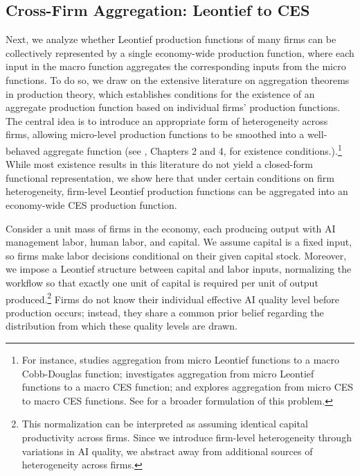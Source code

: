 \subsection{Cross-Firm Aggregation: Leontief to CES}

Next, we analyze whether Leontief production functions of many firms can be collectively represented by a single economy-wide production function, where each input in the macro function aggregates the corresponding inputs from the micro functions. 
To do so, we draw on the extensive literature on aggregation theorems in production theory, which establishes conditions for the existence of an aggregate production function based on individual firms' production functions.
The central idea is to introduce an appropriate form of heterogeneity across firms, allowing micro-level production functions to be smoothed into a well-behaved aggregate function (see \cite{sato1975production}, Chapters 2 and 4, for existence conditions.).\footnote{
For instance, \cite{houthakker1955pareto} studies aggregation from micro Leontief functions to a macro Cobb-Douglas function; \cite{levhari1968note} investigates aggregation from micro Leontief functions to a macro CES function; and \cite{sato1969micro} explores aggregation from micro CES to macro CES functions. 
See \cite{baqaee2019foundations} for a broader formulation of this problem.}
While most existence results in this literature do not yield a closed-form functional representation, we show here that under certain conditions on firm heterogeneity, firm-level Leontief production functions can be aggregated into an economy-wide CES production function.

Consider a unit mass of firms in the economy, each producing output with AI management labor, human labor, and capital.
We assume capital is a fixed input, so firms make labor decisions conditional on their given capital stock.
Moreover, we impose a Leontief structure between capital and labor inputs, normalizing the workflow so that exactly one unit of capital is required per unit of output produced.\footnote{This normalization can be interpreted as assuming identical capital productivity across firms. Since we introduce firm-level heterogeneity through variations in AI quality, we abstract away from additional sources of heterogeneity across firms.} 
Firms do not know their individual effective AI quality level before production occurs; instead, they share a common prior belief regarding the distribution from which these quality levels are drawn.

